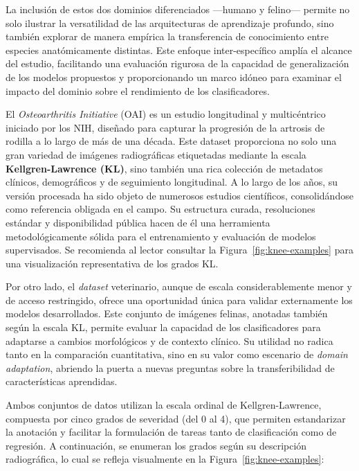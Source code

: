 \documentclass[11pt,spanish,listoffigures,listoftables]{tfgetsinf}
\begin{document}
La inclusión de estos dos dominios diferenciados —humano y felino— permite no
solo ilustrar la versatilidad de las arquitecturas de aprendizaje profundo,
sino también explorar de manera empírica la transferencia de conocimiento entre
especies anatómicamente distintas. Este enfoque inter-específico amplía el
alcance del estudio, facilitando una evaluación rigurosa de la capacidad de
generalización de los modelos propuestos y proporcionando un marco idóneo para
examinar el impacto del dominio sobre el rendimiento de los clasificadores.

El \textit{Osteoarthritis Initiative} (OAI) es un estudio longitudinal y
multicéntrico iniciado por los NIH, diseñado para capturar la progresión de la
artrosis de rodilla a lo largo de más de una década. Este dataset proporciona
no solo una gran variedad de imágenes radiográficas etiquetadas mediante la
escala \textbf{Kellgren-Lawrence (KL)}, sino también una rica colección de
metadatos clínicos, demográficos y de seguimiento longitudinal. A lo largo de
los años, su versión procesada ha sido objeto de numerosos estudios
científicos, consolidándose como referencia obligada en el campo. Su estructura
curada, resoluciones estándar y disponibilidad pública hacen de él una
herramienta metodológicamente sólida para el entrenamiento y evaluación de
modelos supervisados. Se recomienda al lector consultar la
Figura~\ref{fig:knee-examples} para una visualización representativa de los
grados KL.

Por otro lado, el \textit{dataset} veterinario, aunque de escala
considerablemente menor y de acceso restringido, ofrece una oportunidad única
para validar externamente los modelos desarrollados. Este conjunto de imágenes
felinas, anotadas también según la escala KL, permite evaluar la capacidad de
los clasificadores para adaptarse a cambios morfológicos y de contexto clínico.
Su utilidad no radica tanto en la comparación cuantitativa, sino en su valor
como escenario de \textit{domain adaptation}, abriendo la puerta a nuevas
preguntas sobre la transferibilidad de características aprendidas.

Ambos conjuntos de datos utilizan la escala ordinal de Kellgren-Lawrence,
compuesta por cinco grados de severidad (del 0 al 4), que permiten estandarizar
la anotación y facilitar la formulación de tareas tanto de clasificación como
de regresión. A continuación, se enumeran los grados según su descripción
radiográfica, lo cual se refleja visualmente en la
Figura~\ref{fig:knee-examples}:
\end{document}
